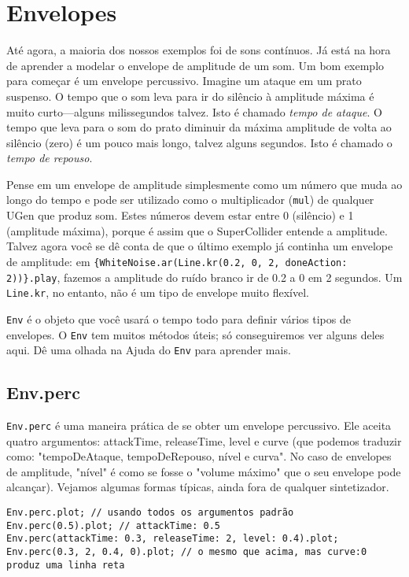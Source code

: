 \section{Envelopes}

Até agora, a maioria dos nossos exemplos foi de sons contínuos. Já está na hora de aprender a modelar o envelope de amplitude de um som. Um bom exemplo para começar é um envelope percussivo. Imagine um ataque em um prato suspenso. O tempo que o som leva para ir do silêncio à amplitude máxima é muito curto---alguns milissegundos talvez. Isto é chamado \emph{tempo de ataque}. O tempo que leva para o som do prato diminuir da máxima amplitude de volta ao silêncio (zero) é um pouco mais longo, talvez alguns segundos. Isto é chamado o \emph{tempo de repouso}.

Pense em um envelope de amplitude simplesmente como um número que muda ao longo do tempo e pode ser utilizado como o multiplicador (\texttt{mul}) de qualquer UGen que produz som. Estes números devem estar entre 0 (silêncio) e 1 (amplitude máxima), porque é assim que o SuperCollider entende a amplitude. Talvez agora você se dê conta de que o último exemplo já continha um envelope de amplitude: em \texttt{\{WhiteNoise.ar(Line.kr(0.2, 0, 2, doneAction: 2))\}.play}, fazemos a amplitude do ruído branco ir de 0.2 a 0 em 2 segundos. Um \texttt{Line.kr}, no entanto, não é um tipo de envelope muito flexível.

\texttt{Env} é o objeto que você usará o tempo todo para definir vários tipos de envelopes. O \texttt{Env} tem muitos métodos úteis; só conseguiremos ver alguns deles aqui. Dê uma olhada na Ajuda do \texttt{Env} para aprender mais. 

\subsection{Env.perc}

\texttt{Env.perc} é uma maneira prática de se obter um envelope percussivo. Ele aceita quatro argumentos:  attackTime, releaseTime, level e curve (que podemos traduzir como: "tempoDeAtaque, tempoDeRepouso, nível e curva". No caso de envelopes de amplitude, "nível" é como se fosse o "volume máximo" que o seu envelope pode alcançar). Vejamos algumas formas típicas, ainda fora de qualquer sintetizador.

\begin{lstlisting}[style=SuperCollider-IDE, basicstyle=\scttfamily\footnotesize]
Env.perc.plot; // usando todos os argumentos padrão
Env.perc(0.5).plot; // attackTime: 0.5
Env.perc(attackTime: 0.3, releaseTime: 2, level: 0.4).plot;
Env.perc(0.3, 2, 0.4, 0).plot; // o mesmo que acima, mas curve:0 produz uma linha reta
\end{lstlisting}
 
